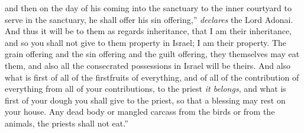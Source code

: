 \begin{biblechapter}
\verse and then on the day of his coming into the sanctuary to the inner courtyard to serve in the sanctuary, he shall offer his sin offering,” \textit{declares} the Lord Adonai.
\verse And thus it will be to them as regards inheritance, that I am their inheritance, and so you shall not give to them property in Israel; I am their property.
\verse The grain offering and the sin offering and the guilt offering, they themselves may eat them, and also all the consecrated possessions in Israel will be theirs.
\verse And also what is first of all of the firstfruits of everything, and of all of the contribution of everything from all of your contributions, to the priest \textit{it belongs}, and what is first of your dough you shall give to the priest, so that a blessing may rest on your house.
\verse Any dead body or mangled carcass from the birds or from the animals, the priests shall not eat.”
\end{biblechapter}


